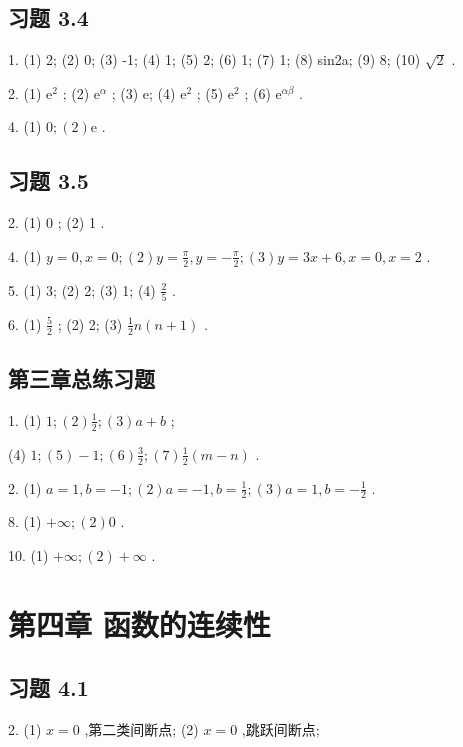 \subsection{习题 3.4}

1. (1) 2; (2) 0; (3) -1; (4) 1; (5) 2; (6) 1; (7) 1; (8) sin2a; (9) 8; (10) \(\sqrt{2}\) .

2. (1) \({\mathrm{e}}^{2}\) ; (2) \({\mathrm{e}}^{\alpha }\) ; (3) e; (4) \({\mathrm{e}}^{2}\) ; (5) \({\mathrm{e}}^{2}\) ; (6) \({\mathrm{e}}^{\alpha \beta }\) .

4. (1) \(0;\left( 2\right) \mathrm{e}\) .

\subsection{习题 3.5}

2. (1) 0 ; (2) 1 .

4. (1) \(y = 0,x = 0;\left( 2\right) y = \frac{\pi }{2},y =  - \frac{\pi }{2};\left( 3\right) y = {3x} + 6,x = 0,x = 2\) .

5. (1) 3; (2) 2; (3) 1; (4) \(\frac{2}{5}\) .

6. (1) \(\frac{5}{2}\) ; (2) 2; (3) \(\frac{1}{2}n\left( {n + 1}\right)\) .

\subsection{第三章总练习题}

1. (1) \(1;\left( 2\right) \frac{1}{2};\left( 3\right) a + b\) ;

(4) \(1;\left( 5\right)  - 1;\left( 6\right) \frac{3}{2};\left( 7\right) \frac{1}{2}\left( {m - n}\right)\) .

2. (1) \(a = 1,b =  - 1;\left( 2\right) a =  - 1,b = \frac{1}{2};\left( 3\right) a = 1,b =  - \frac{1}{2}\) .

8. (1) \(+ \infty ;\left( 2\right) 0\) .

10. (1) \(+ \infty ;\left( 2\right)  + \infty\) .

\section{第四章 函数的连续性}

\subsection{习题 4.1}

2. (1) \(x = 0\) ,第二类间断点; (2) \(x = 0\) ,跳跃间断点;

